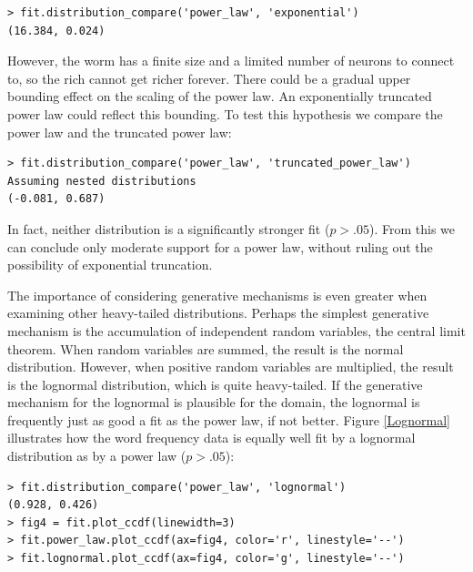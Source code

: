 \documentclass[10pt]{article}
\begin{document}
\begin{verbatim}
> fit.distribution_compare('power_law', 'exponential')
(16.384, 0.024)
\end{verbatim}

However, the worm has a finite size and a limited number of neurons to connect to, so the rich cannot get richer forever. There could be a gradual upper bounding effect on the scaling of the power law. An exponentially truncated power law could reflect this bounding. To test this hypothesis we compare the power law and the truncated power law:

\begin{verbatim}
> fit.distribution_compare('power_law', 'truncated_power_law')
Assuming nested distributions
(-0.081, 0.687)
\end{verbatim}

In fact, neither distribution is a significantly stronger fit ($p>.05$). From this we can conclude only moderate support for a power law, without ruling out the possibility of exponential truncation.

The importance of considering generative mechanisms is even greater when examining other heavy-tailed distributions. Perhaps the simplest generative mechanism is the accumulation of independent random variables, the central limit theorem. When random variables are summed, the result is the normal distribution. However, when positive random variables are multiplied, the result is the lognormal distribution, which is quite heavy-tailed. If the generative mechanism for the lognormal is plausible for the domain, the lognormal is frequently just as good a fit as the power law, if not better. Figure \ref{Lognormal} illustrates how the word frequency data is equally well fit by a lognormal distribution as by a power law ($p>.05$):

\begin{verbatim}
> fit.distribution_compare('power_law', 'lognormal')
(0.928, 0.426)
> fig4 = fit.plot_ccdf(linewidth=3)
> fit.power_law.plot_ccdf(ax=fig4, color='r', linestyle='--')
> fit.lognormal.plot_ccdf(ax=fig4, color='g', linestyle='--')
\end{verbatim}
\end{document}
